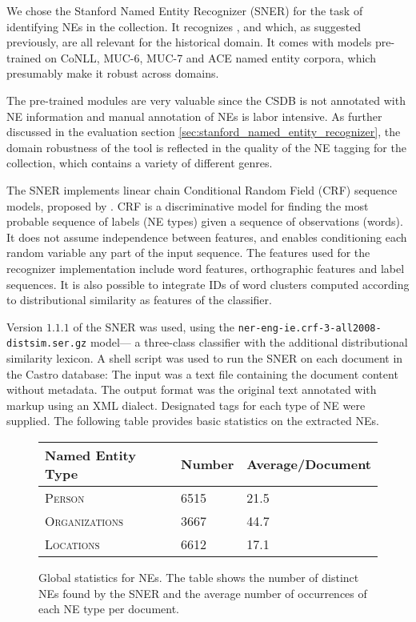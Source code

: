 We chose the Stanford Named Entity Recognizer (SNER) \cite{sner} for the task of identifying NEs in the collection. It recognizes ,  and  which, as suggested previously, are all relevant for the historical domain. It comes with models pre-trained on CoNLL, MUC-6, MUC-7 and ACE named entity corpora, which presumably make it robust across domains.

The pre-trained modules are very valuable since the CSDB is not annotated with NE information and manual annotation of NEs is labor intensive. As further discussed in the evaluation section \ref{sec:stanford_named_entity_recognizer}, the domain robustness of the tool is reflected in the quality of the NE tagging for the collection, which contains a variety of different genres. 

The SNER implements linear chain Conditional Random Field (CRF) sequence models, proposed by \cite{lafferty2001conditional}.
CRF is a discriminative model for finding the most probable sequence of labels (NE types) given a sequence of observations (words). 
It does not assume independence between features, and enables conditioning each random variable any part of the input sequence. The features used for the recognizer implementation include word features, orthographic features and label sequences. It is also possible to integrate IDs of word clusters computed according to distributional similarity as features of the classifier.

Version $1.1.1$ of the SNER was used, using the
\texttt{ner-eng-ie.crf-3-all2008-distsim.ser.gz} model--- a three-class classifier with the additional
distributional similarity lexicon. A shell script was used to run the SNER on each document in the Castro database: The input was a text file containing the document content without metadata. The output format was the original text annotated with markup using an XML dialect. Designated tags for each type of NE were supplied. The following table provides basic statistics on the extracted NEs.

\begin{figure}[ht]
\centering
\caption{Global statistics for NEs. The table shows the number of distinct NEs found by the SNER and the average number of occurrences of each NE type per document.}
\begin{tabular}{l|ll}
  Named Entity Type      & Number & Average/Document\\
  \hline
  \textsc{Person}        & 6515   & 21.5\\
  \textsc{Organizations} & 3667   & 44.7\\
  \textsc{Locations}     & 6612   & 17.1\\
\end{tabular}
\label{fig:ne_statistics}
\end{figure}
